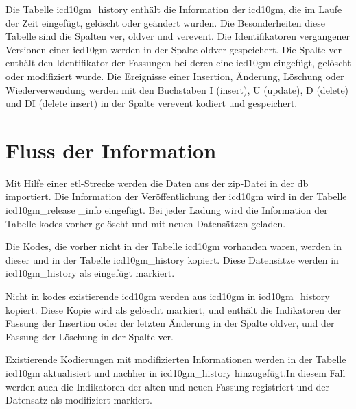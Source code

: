 Die Tabelle \glqq\textsf{icd10gm\_history}\grqq{} enthält die Information der \ac{icd10gm}, die im Laufe der Zeit eingefügt, gelöscht oder geändert wurden. Die Besonderheiten diese Tabelle sind die Spalten \glqq\textsf{ver}\grqq{}, \glqq\textsf{oldver}\grqq{} und \glqq\textsf{verevent}\grqq{}. Die Identifikatoren vergangener Versionen einer \ac{icd10gm} werden in der Spalte \glqq\textsf{oldver}\grqq{} gespeichert. Die Spalte \glqq\textsf{ver}\grqq{} enthält den Identifikator der Fassungen bei deren eine \ac{icd10gm} eingefügt, gelöscht oder modifiziert wurde. Die Ereignisse einer Insertion, Änderung, Löschung oder Wiederverwendung werden mit den Buchstaben \glqq\textsf{I}\grqq{} (insert), \glqq\textsf{U}\grqq{} (update), \glqq\textsf{D}\grqq{} (delete) und \glqq\textsf{DI}\grqq{} (delete insert) in der Spalte \glqq\textsf{verevent}\grqq{} kodiert und gespeichert.

\section{Fluss der Information} \label{sec:dbrun}

Mit Hilfe einer \ac{etl}-Strecke werden die Daten aus der \ac{zip}-Datei in der \ac{db} importiert. Die Information der Veröffentlichung der \ac{icd10gm} wird in der Tabelle \glqq\textsf{icd10gm\_release \_info}\grqq{} eingefügt. Bei jeder Ladung wird die Information der Tabelle \glqq\textsf{kodes}\grqq{} vorher gelöscht und mit neuen Datensätzen geladen. 

Die Kodes, die vorher nicht in der Tabelle \glqq\textsf{icd10gm}\grqq{} vorhanden waren, werden in dieser und in der Tabelle \glqq\textsf{icd10gm\_history}\grqq{} kopiert. Diese Datensätze werden in \glqq\textsf{icd10gm\_history}\grqq{} als eingefügt markiert. 

Nicht in \glqq\textsf{kodes}\grqq{} existierende \ac{icd10gm} werden aus \glqq\textsf{icd10gm}\grqq{} in \glqq\textsf{icd10gm\_history}\grqq{} kopiert. Diese Kopie wird als gelöscht markiert, und enthält die Indikatoren der Fassung der Insertion oder der letzten Änderung in der Spalte \glqq\textsf{oldver}\grqq{}, und der Fassung der Löschung in der Spalte \glqq\textsf{ver}\grqq{}. 

Existierende Kodierungen mit modifizierten Informationen werden in der Tabelle \glqq\textsf{icd10gm}\grqq{} aktualisiert und nachher in \glqq\textsf{icd10gm\_history}\grqq{} hinzugefügt.In diesem Fall werden auch die Indikatoren der alten und neuen Fassung registriert und der Datensatz als modifiziert markiert.

